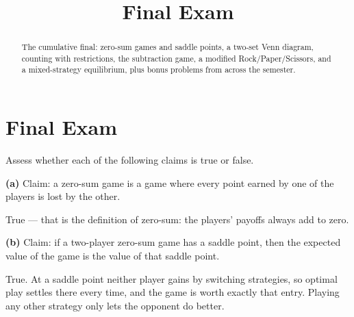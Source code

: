 \documentclass[12pt]{ximera}
\title{Final Exam}
\begin{document}
\begin{abstract}
The cumulative final: zero-sum games and saddle points, a two-set Venn diagram,
counting with restrictions, the subtraction game, a modified Rock/Paper/Scissors, and
a mixed-strategy equilibrium, plus bonus problems from across the semester.
\end{abstract}
\maketitle

\section*{Final Exam}

\begin{problem}
Assess whether each of the following claims is true or false.

\begin{prompt}
\textbf{(a)} Claim: a zero-sum game is a game where every point earned by one of the
players is lost by the other.

\begin{multipleChoice}
\end{multipleChoice}

\begin{feedback}
True --- that is the definition of zero-sum: the players' payoffs always add to zero.
\end{feedback}
\end{prompt}

\begin{prompt}
\textbf{(b)} Claim: if a two-player zero-sum game has a saddle point, then the expected
value of the game is the value of that saddle point.

\begin{multipleChoice}
\end{multipleChoice}

\begin{feedback}
True. At a saddle point neither player gains by switching strategies, so optimal play
settles there every time, and the game is worth exactly that entry. Playing any other
strategy only lets the opponent do better.
\end{feedback}
\end{prompt}
\end{problem}
\end{document}
